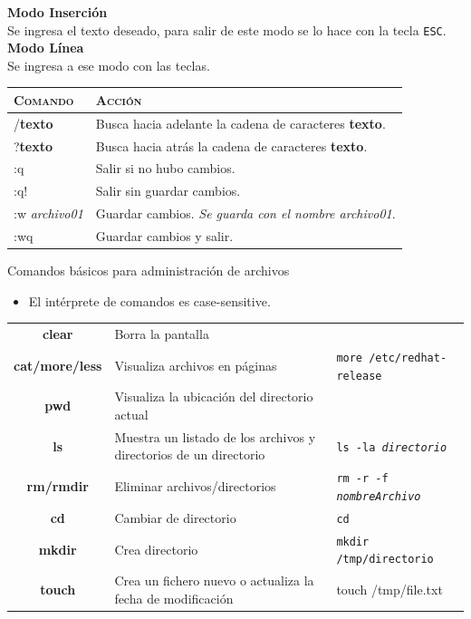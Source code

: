\documentclass{beamer}
\begin{document}
\begin{frame}
\textbf{Modo Inserción}\\
Se ingresa el texto deseado, para salir de este modo se lo hace con la tecla \texttt{ESC}.\\[0.5cm]
\textbf{Modo Línea}\\
Se ingresa a ese modo con las teclas.
{\scriptsize
\begin{tabular}{l|l}
\textsc{Comando}&\textsc{Acción}  \\\hline
/\textbf{texto} & Busca hacia adelante la cadena de caracteres \textbf{texto}.\\\hline
?\textbf{texto} & Busca hacia atrás la cadena de caracteres \textbf{texto}.\\\hline
:q & Salir si no hubo cambios. \\\hline
:q! & Salir sin guardar cambios.\\\hline
:w \textit{archivo01} & Guardar cambios. \textit{Se guarda con el nombre archivo01}.\\\hline
:wq & Guardar cambios y salir.

\end{tabular}
}
\end{frame}
\begin{frame}{Comandos básicos para administración de archivos}
\begin{itemize}
    \item El intérprete de comandos es \textit{}{case-sensitive}.
\end{itemize}
{\scriptsize
\begin{tabular}{c|p{5cm}|l}
\hline
\textbf{clear} & Borra la pantalla   &\\
\textbf{cat/more/less}  & Visualiza archivos en páginas  & \texttt{more /etc/redhat-release}\\
\textbf{pwd} & Visualiza la ubicación del directorio actual   &\\
\textbf{ls} & Muestra un listado de los archivos y directorios de un directorio   & \texttt{ls -la \textit{directorio} }\\
\textbf{rm/rmdir} & Eliminar archivos/directorios   & \texttt{rm -r -f  \textit{nombreArchivo}}\\
\textbf{cd} & Cambiar de directorio   & \texttt{cd} \\
\textbf{mkdir} & Crea directorio   & \texttt{mkdir /tmp/directorio} \\
\textbf{touch} & Crea un fichero nuevo o actualiza la fecha de modificación & touch /tmp/file.txt
\end{tabular}
 }
\end{frame}
\end{document}
